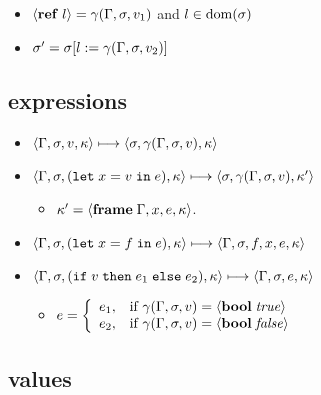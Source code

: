 \documentclass{article}
\begin{document}
\begin{minipage}{\textwidth}
\begin{minipage}[t]{0.50\textwidth}
\begin{itemize}
\begin{itemize}
\item $\langle\mathbf{ref}\; l\rangle=\gamma(\Gamma,\sigma,v_1)$ and $l\in\operatorname{dom}(\sigma)$
\item $\sigma'=\sigma[l:= \gamma(\Gamma,\sigma,v_2)]$
\end{itemize}
\end{itemize}

\end{minipage}
\begin{minipage}[t]{0.50\textwidth}

\subsection{expressions}
\begin{itemize}
\item $\langle\Gamma,\sigma,v,\kappa\rangle \longmapsto \langle \sigma,\gamma(\Gamma,\sigma,v),\kappa \rangle$

\item $\langle\Gamma,\sigma,(\mathtt{let}\; x=v\; \mathtt{in}\; e),\kappa\rangle \longmapsto \langle\sigma,\gamma(\Gamma,\sigma,v),\kappa'\rangle$

\begin{itemize}
\item $\kappa' = \langle\mathbf{frame}\; \Gamma,x,e,\kappa\rangle$.
\end{itemize}

\item $\langle\Gamma,\sigma,(\mathtt{let}\; x=f\; \mathtt{in}\; e),\kappa\rangle \longmapsto \langle\Gamma,\sigma,f,x, e, \kappa\rangle$

\item $\langle\Gamma,\sigma,(\mathtt{if}\; v\; \mathtt{then}\; e_1\; \mathtt{else}\; e_2),\kappa\rangle \longmapsto \langle\Gamma,\sigma, e, \kappa\rangle$

\begin{itemize}
  \item $\displaystyle e = \left\{\begin{array}{rl}
e_1, & \text{if } \gamma(\Gamma,\sigma,v) = \langle\mathbf{bool}\; \mathit{true}\rangle \\
e_2, & \text{if } \gamma(\Gamma,\sigma,v) = \langle\mathbf{bool}\; \mathit{false}\rangle
\end{array}\right.$

\end{itemize}
\end{itemize}

\subsection{values}


\end{minipage}
\end{minipage}
\end{document}
